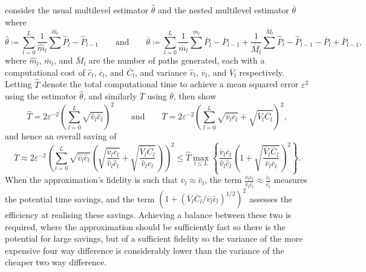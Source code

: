 \documentclass[9pt,a4paper,english]{extarticle}
\begin{document}
\citet{giles2020approximating} consider the usual multilevel estimator $ \hat{\theta} $ and the nested multilevel estimator $ \overline{\theta} $ where
\begin{equation*}
\hat{\theta}  \coloneqq \sum_{l=0}^{L} \dfrac{1}{\widehat{m}_l} \sum^{\widehat{m}_l} \widehat{P}_l - \widehat{P}_{l-1}
\qquad \text{and} \qquad
\overline{\theta} \coloneqq \sum_{l=0}^L \dfrac{1}{\overline{m}_l} \sum^{\overline{m}_l} \overline{P}_l - \overline{P}_{l-1} + \dfrac{1}{\overline{M}_l} \sum^{\overline{M}_l} \widehat{P}_l - \widehat{P}_{l-1} - \overline{P}_l + \overline{P}_{l-1},
\end{equation*}
where $ \widehat{m}_l $, $ \overline{m}_l $, and $ \overline{M}_l $ are the number of paths generated, each with a computational cost of $ \hat{c}_l $, $ \overline{c}_l $, and $ \overline{C}_l $, and variance $ \hat{v}_l $, $ \overline{v}_l $, and $ \overline{V}_l $ respectively. Letting $ \widehat{T} $ denote the total computational time to achieve a mean squared error $ \varepsilon^2 $ using the estimator $ \hat{\theta} $, and similarly $ \overline{T} $ using $ \overline{\theta} $, then \citet{giles2020approximating} show
\begin{equation*}
\widehat{T} = 2\varepsilon^{-2}\left(\sum_{l=0}^L \sqrt{\hat{v}_l \hat{c}_l}\right)^2 
\qquad \text{and} \qquad 
\overline{T} = 2\varepsilon^{-2} \left(\sum_{l=0}^L \sqrt{\overline{v}_l \overline{c}_l} + \sqrt{\overline{V}_l \overline{C}_l}\right)^2,
\end{equation*}
and hence an overall saving of
\begin{equation*}
\overline{T} 
\approx 2\varepsilon^{-2} \left(\sum_{l=0}^L \sqrt{\hat{v}_l \hat{c}_l} \left( \sqrt{\dfrac{\overline{v}_l\overline{c}_l}{\hat{v}_l\hat{c}_l}} + \sqrt{\dfrac{\overline{V}_l \overline{C}_l}{\hat{v}_l \hat{c}_l}}\right)\right)^2 
\leq \widehat{T} \max_{l \leq L} \left\{ \dfrac{\overline{v}_l\overline{c}_l}{\hat{v}_l\hat{c}_l} \left(1 + \sqrt{\dfrac{\overline{V}_l \overline{C}_l}{\overline{v}_l \overline{c}_l}}\right)^2\right\}.
\end{equation*}
When the approximation's fidelity is such that $ \overline{v}_l \approx \hat{v}_l $, the term $ \tfrac{\overline{v}_l\overline{c}_l}{\hat{v}_l\hat{c}_l} \approx \tfrac{\overline{c}_l}{\hat{c}_l}$ measures the potential time savings, and the term $ (1 + (\overline{V}_l \overline{C}_l / \overline{v}_l \overline{c}_l)^{1/2})^2 $ assesses the efficiency at realising these savings. Achieving a balance between these two is required, where the approximation should be sufficiently fast so there is the potential for large savings, but of a sufficient fidelity so the variance of the more expensive four way difference is considerably lower than the variance of the cheaper two way difference.
\end{document}
